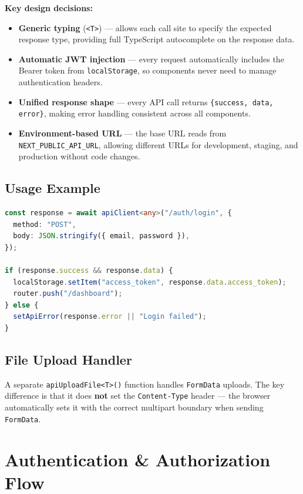 \documentclass[12pt,a4paper]{article}
\begin{document}
\textbf{Key design decisions:}
\begin{itemize}[leftmargin=2em]
    \item \textbf{Generic typing} (\texttt{<T>}) — allows each call site to specify the expected response type, providing full TypeScript autocomplete on the response data.
    \item \textbf{Automatic JWT injection} — every request automatically includes the Bearer token from \texttt{localStorage}, so components never need to manage authentication headers.
    \item \textbf{Unified response shape} — every API call returns \texttt{\{success, data, error\}}, making error handling consistent across all components.
    \item \textbf{Environment-based URL} — the base URL reads from \texttt{NEXT\_PUBLIC\_API\_URL}, allowing different URLs for development, staging, and production without code changes.
\end{itemize}

\subsection{Usage Example}

\begin{lstlisting}[language=TypeScript,title={Calling the API from a component}]
const response = await apiClient<any>("/auth/login", {
  method: "POST",
  body: JSON.stringify({ email, password }),
});

if (response.success && response.data) {
  localStorage.setItem("access_token", response.data.access_token);
  router.push("/dashboard");
} else {
  setApiError(response.error || "Login failed");
}
\end{lstlisting}

\subsection{File Upload Handler}

A separate \texttt{apiUploadFile<T>()} function handles \texttt{FormData} uploads. The key difference is that it does \textbf{not} set the \texttt{Content-Type} header — the browser automatically sets it with the correct multipart boundary when sending \texttt{FormData}.

\section{Authentication \& Authorization Flow}
\end{document}
